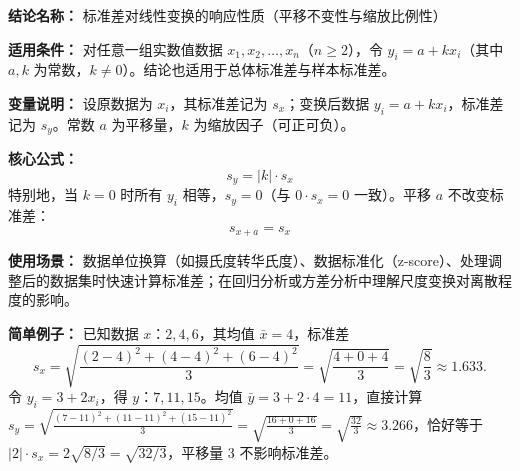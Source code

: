 \textbf{结论名称：} 标准差对线性变换的响应性质（平移不变性与缩放比例性）

\textbf{适用条件：} 对任意一组实数值数据 \(x_1, x_2, \dots, x_n\)（\(n \ge 2\)），令 \(y_i = a + kx_i\)（其中 \(a, k\) 为常数，\(k \neq 0\)）。结论也适用于总体标准差与样本标准差。

\textbf{变量说明：} 设原数据为 \(x_i\)，其标准差记为 \(s_x\)；变换后数据 \(y_i = a + k x_i\)，标准差记为 \(s_y\)。常数 \(a\) 为平移量，\(k\) 为缩放因子（可正可负）。

\textbf{核心公式：}
\[
\boxed{s_y = |k| \cdot s_x}
\]
特别地，当 \(k=0\) 时所有 \(y_i\) 相等，\(s_y = 0\)（与 \(0\cdot s_x=0\) 一致）。平移 \(a\) 不改变标准差：
\[
s_{x + a} = s_x
\]

\textbf{使用场景：} 数据单位换算（如摄氏度转华氏度）、数据标准化（z-score）、处理调整后的数据集时快速计算标准差；在回归分析或方差分析中理解尺度变换对离散程度的影响。

\textbf{简单例子：} 已知数据 \(x\)：\(2, 4, 6\)，其均值 \(\bar{x}=4\)，标准差
\[
s_x=\sqrt{\frac{(2-4)^2+(4-4)^2+(6-4)^2}{3}}=\sqrt{\frac{4+0+4}{3}}=\sqrt{\frac{8}{3}}\approx 1.633.
\]
令 \(y_i = 3 + 2x_i\)，得 \(y\)：\(7, 11, 15\)。均值 \(\bar{y}=3+2\cdot4=11\)，直接计算 \(s_y=\sqrt{\frac{(7-11)^2+(11-11)^2+(15-11)^2}{3}}=\sqrt{\frac{16+0+16}{3}}=\sqrt{\frac{32}{3}}\approx 3.266\)，恰好等于 \(|2|\cdot s_x = 2\sqrt{8/3} = \sqrt{32/3}\)，平移量 \(3\) 不影响标准差。
